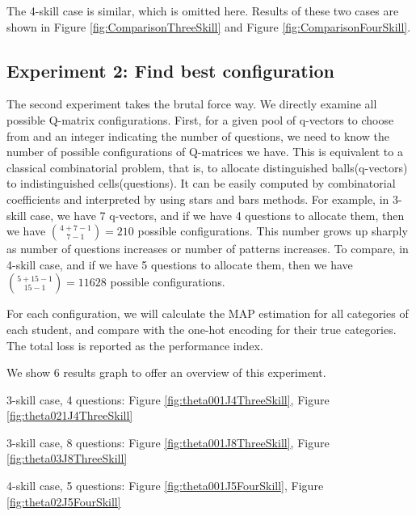 \documentclass{edm_template}
\begin{document}
The 4-skill case is similar, which is omitted here. Results of these two cases are shown in Figure  \ref{fig:ComparisonThreeSkill} and Figure \ref{fig:ComparisonFourSkill}.

\subsection{Experiment 2: Find best configuration}
The second experiment takes the brutal force way. We directly examine all possible Q-matrix configurations. First, for a given pool of q-vectors to choose from and an integer indicating the number of questions, we need to know the number of possible configurations of Q-matrices we have. This is equivalent to a classical combinatorial problem, that is, to allocate distinguished balls(q-vectors) to indistinguished cells(questions). It can be easily computed by combinatorial coefficients and interpreted by using stars and bars methods. For example, in 3-skill case, we have 7 q-vectors, and if we have 4 questions to allocate them, then we have ${{4+7-1}\choose {7-1}}=210$ possible configurations. This number grows up sharply as number of questions increases or number of patterns increases. To compare, in 4-skill case, and if we have 5 questions to allocate them, then we have ${{5+15-1}\choose {15-1}}=11628$ possible configurations. 

For each configuration, we will calculate the MAP estimation for all categories of each student, and compare with the one-hot encoding for their true categories. The total loss is reported as the performance index.

We show 6 results graph to offer an overview of this experiment.

3-skill case, 4 questions: Figure \ref{fig:theta001J4ThreeSkill}, Figure \ref{fig:theta021J4ThreeSkill}

3-skill case, 8 questions: Figure \ref{fig:theta001J8ThreeSkill}, Figure \ref{fig:theta03J8ThreeSkill}

4-skill case, 5 questions: Figure \ref{fig:theta001J5FourSkill}, Figure \ref{fig:theta02J5FourSkill}
\end{document}
